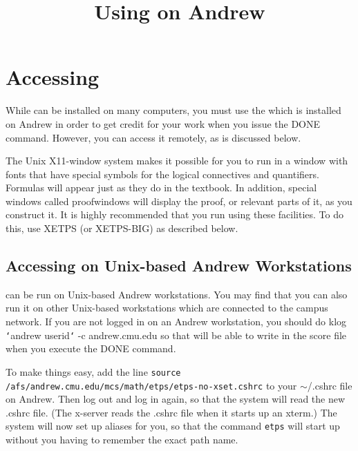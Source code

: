 \documentclass{article}
\begin{document}
\title{Using {\ETPS} on Andrew}
\date{}				%
\maketitle


\section{Accessing {\ETPS}}

While {\ETPS} can be installed on many computers, you must use the
{\ETPS} which is installed on Andrew in order to get credit for your work
when you issue the DONE command. However, you can access it remotely,
as is discussed below.

The Unix X11-window system makes it possible for you to run {\ETPS} in a
window with fonts that have special symbols for the logical
connectives and quantifiers. Formulas will appear just as they do in
the textbook. In addition, special windows called proofwindows
will display the proof, or relevant parts of it, as you construct it.
It is highly recommended that you run {\ETPS} using these facilities.
To do this, use XETPS (or XETPS-BIG) as described below.

\subsection{Accessing {\ETPS} on Unix-based Andrew Workstations}

{\ETPS} can be run on Unix-based Andrew workstations.
You may  find that you can also run it on other Unix-based
workstations which are connected to the campus network.
If you are not logged in on an Andrew workstation, you should do\newline{}
klog {\tt\char`\<}andrew userid{\tt\char`\>} -c andrew.cmu.edu\newline{}
so that {\ETPS} will be able to write in the score file when you
execute the DONE command.

To make things easy, add the line\newline{}
{\tt source /afs/andrew.cmu.edu/mcs/math/etps/etps-no-xset.cshrc}\newline{}
to your $\sim$/.cshrc file on Andrew. Then log out and log in again, so
that the system will read the new .cshrc file.
(The x-server reads the .cshrc file when it starts up an xterm.)
The system will now set up aliases for you, so that the command\newline{}
{\tt etps}\newline{}
will start up {\ETPS} without you having to remember the exact path name.
\end{document}
